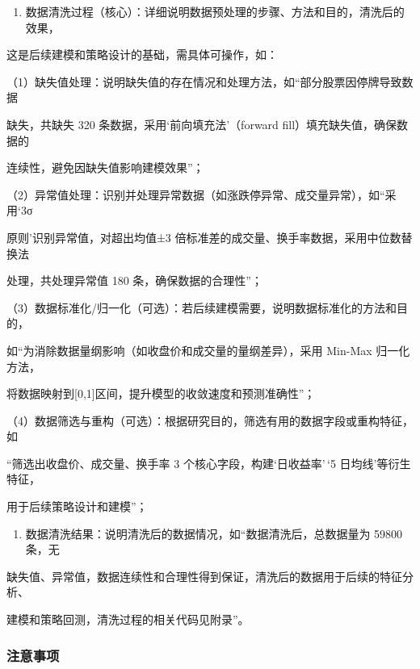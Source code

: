 \documentclass[
]{article}
\providecommand{\tightlist}{%
  \setlength{\itemsep}{0pt}\setlength{\parskip}{0pt}}
\begin{document}
\begin{enumerate}
\def\labelenumi{\arabic{enumi}.}
\setcounter{enumi}{2}
\tightlist
\item
  数据清洗过程（核心）：详细说明数据预处理的步骤、方法和目的，清洗后的效果，
\end{enumerate}

这是后续建模和策略设计的基础，需具体可操作，如：

（1）缺失值处理：说明缺失值的存在情况和处理方法，如``部分股票因停牌导致数据

缺失，共缺失 320 条数据，采用`前向填充法'（forward
fill）填充缺失值，确保数据的

连续性，避免因缺失值影响建模效果''；

（2）异常值处理：识别并处理异常数据（如涨跌停异常、成交量异常），如``采用`3σ

原则'识别异常值，对超出均值±3
倍标准差的成交量、换手率数据，采用中位数替换法

处理，共处理异常值 180 条，确保数据的合理性''；

（3）数据标准化/归一化（可选）：若后续建模需要，说明数据标准化的方法和目的，

如``为消除数据量纲影响（如收盘价和成交量的量纲差异），采用 Min-Max
归一化方法，

将数据映射到{[}0,1{]}区间，提升模型的收敛速度和预测准确性''；

（4）数据筛选与重构（可选）：根据研究目的，筛选有用的数据字段或重构特征，如

``筛选出收盘价、成交量、换手率 3 个核心字段，构建`日收益率'\,`5
日均线'等衍生特征，

用于后续策略设计和建模''；

\begin{enumerate}
\def\labelenumi{\arabic{enumi}.}
\setcounter{enumi}{3}
\tightlist
\item
  数据清洗结果：说明清洗后的数据情况，如``数据清洗后，总数据量为 59800
  条，无
\end{enumerate}

缺失值、异常值，数据连续性和合理性得到保证，清洗后的数据用于后续的特征分析、

建模和策略回测，清洗过程的相关代码见附录''。

\hypertarget{ux6ce8ux610fux4e8bux9879-2}{%
\subsubsection{\texorpdfstring{\textbf{注意事项}}{注意事项}}\label{ux6ce8ux610fux4e8bux9879-2}}
\end{document}
